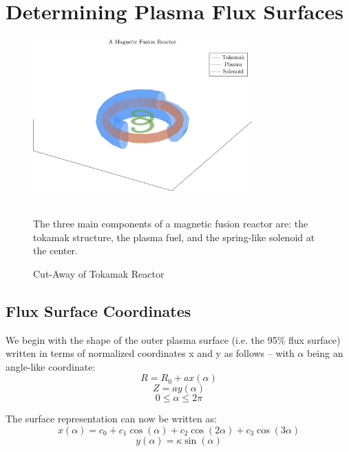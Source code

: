\chapter{Determining Plasma Flux Surfaces}

\label{chapter:flux}

\begin{figure}[h]
	\centering
	\includegraphics[width=0.75\textwidth]{images/fusion_reactor}
	\caption{Cut-Away of Tokamak Reactor} ~\\
	\small The three main components of a magnetic fusion reactor are: the tokamak structure, the plasma fuel, and the spring-like solenoid at the center.
\end{figure}

\section{Flux Surface Coordinates}

We begin with the shape of the outer plasma surface (i.e. the 95\% flux surface) written in terms of normalized coordinates x and y as follows -- with $\alpha$ being an angle-like coordinate:
\begin{equation}
	R = R_0 + a x( \alpha )
\end{equation}
\begin{equation}
	Z = a y( \alpha )
\end{equation}
\begin{equation}
	0 \le \alpha \le 2 \pi
\end{equation}

The surface representation can now be written as:
\begin{equation}
	\label{eq:xalpha}
	x(\alpha) = c_0 + c_1 \cos(\alpha) + c_2 \cos(2\alpha) + c_3 \cos(3\alpha)
\end{equation}
\begin{equation}
	\label{eq:yalpha}
	y(\alpha) = \kappa \sin(\alpha)
\end{equation}

